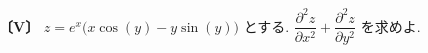 \noindent\textbf{〔V〕}
$z=e^{x}\bigl(x\cos(y)-y\sin(y)\bigr)$ とする.
$\dfrac{\partial^2 z}{\partial x^2}+\dfrac{\partial^2 z}{\partial y^2}$ を求めよ.
